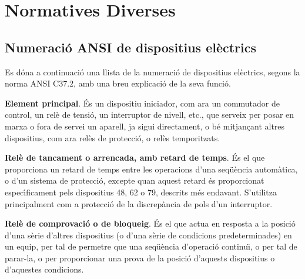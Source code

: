 \chapter{Normatives Diverses}

\section{Numeraci\'{o} ANSI de dispositius el\`{e}ctrics} 

Es d\'{o}na a continuaci\'{o} una llista de la numeraci\'{o} de dispositius
el\`{e}ctrics, segons la norma \textsf{ANSI C37.2}, amb una breu
explicaci\'{o} de la seva funci\'{o}.

\begin{multicols}{2}
\begin{list}{}
{\setlength{\labelwidth}{6mm} \setlength{\leftmargin}{6mm}
\setlength{\labelsep}{2mm}}

\item[\textbf{1}]  \textbf{Element principal}. \'{E}s un dispositiu
iniciador, com ara un commutador de control, un rel\`{e} de tensi\'{o}, un
interruptor de nivell, etc., que serveix per posar en marxa o fora
de servei un aparell, ja sigui directament, o b\'{e}  mitjan\c{c}ant altres
dispositius, com ara rel\`{e}s de protecci\'{o}, o rel\`{e}s temporitzats.

\item[\textbf{2}]  \textbf{Rel\`{e}
de tancament o arrencada, amb retard de temps}. \'{E}s el que
proporciona un retard de temps entre les operacions d'una seq\"{u}\`{e}ncia
autom\`{a}tica, o d'un sistema de protecci\'{o}, excepte quan aquest retard
\'{e}s proporcionat espec\'{\i}ficament pels dispositius 48, 62 o 79,
descrits m\'{e}s endavant. S'utilitza principalment com a protecci\'{o} de
la discrep\`{a}ncia de pols d'un interruptor.

\item[\textbf{3}]  \textbf{Rel\`{e} de comprovaci\'{o} o
de bloqueig}. \'{E}s el que actua en resposta a la posici\'{o} d'una s\`{e}rie
d'altres dispositius (o d'una s\`{e}rie de condicions predeterminades)
en un equip, per tal de permetre que una seq\"{u}\`{e}ncia d'operaci\'{o}
continu\"{\i}, o per tal de parar-la, o per proporcionar una prova de la
posici\'{o} d'aquests dispositius o d'aquestes condicions.


\end{list}
\end{multicols}
